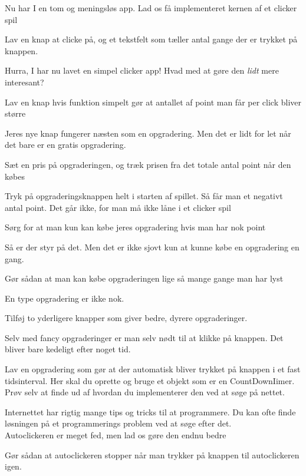 Nu har I en tom og meningsløs app. Lad os få implementeret kernen af et clicker spil
\begin{exercise}
	Lav en knap at clicke på, og et tekstfelt som tæller antal gange der er trykket på knappen.
\end{exercise}
Hurra, I har nu lavet en simpel clicker app! Hvad med at gøre den \textit{lidt} mere interesant?
\begin{exercise}
	Lav en knap hvis funktion simpelt gør at antallet af point man får per click bliver større
\end{exercise}
Jeres nye knap fungerer næsten som en opgradering. Men det er lidt for let når det bare er en gratis opgradering. 
\begin{exercise}
	Sæt en pris på opgraderingen, og træk prisen fra det totale antal point når den købes
\end{exercise}
Tryk på opgraderingsknappen helt i starten af spillet. Så får man et negativt antal point. Det går ikke, for man må ikke låne i et clicker spil
\begin{exercise}
	Sørg for at man kun kan købe jeres opgradering hvis man har nok point
\end{exercise}
Så er der styr på det. Men det er ikke sjovt kun at kunne købe en opgradering en gang.
\begin{exercise}
	Gør sådan at man kan købe opgraderingen lige så mange gange man har lyst
\end{exercise}
En type opgradering er ikke nok. 
\begin{exercise}
	Tilføj to yderligere knapper som giver bedre, dyrere opgraderinger.
\end{exercise}
Selv med fancy opgraderinger er man selv nødt til at klikke på knappen. Det bliver bare kedeligt efter noget tid.
\begin{exercise}
	Lav en opgradering som gør at der automatisk bliver trykket på knappen i et fast tidsinterval.
	Her skal du oprette og bruge et objekt som er en CountDownIimer. Prøv selv at finde ud af hvordan du implementerer den ved at søge på nettet.
\end{exercise}
Internettet har rigtig mange tips og tricks til at programmere. Du kan ofte finde løsningen på et programmerings problem ved at søge efter det.\\
Autoclickeren er meget fed, men lad os gøre den endnu bedre
\begin{exercise}
	Gør sådan at autoclickeren stopper når man trykker på knappen til autoclickeren igen.
\end{exercise}
